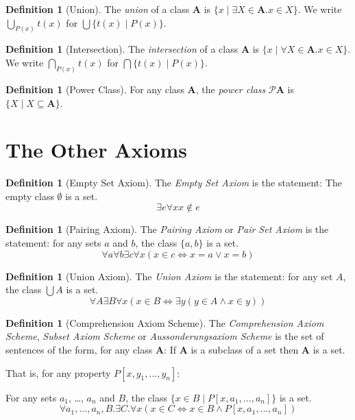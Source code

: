 \documentclass{book}
\theoremstyle{definition}
\newtheorem{df}[ax]{Definition}
\begin{document}
\begin{df}[Union]
The \emph{union} of a class $\mathbf{A}$ is $\{ x \mid \exists X \in \mathbf{A}. x \in X\}$.
We write $\bigcup_{P(x)} t(x)$ for $\bigcup \{ t(x) \mid P(x) \}$.
\end{df}

\begin{df}[Intersection]
The \emph{intersection} of a class $\mathbf{A}$ is $\{ x \mid \forall X \in \mathbf{A}. x \in X \}$. We write $\bigcap_{P(x)} t(x)$ for $\bigcap \{ t(x) \mid P(x) \}$.
\end{df}

\begin{df}[Power Class]
For any class $\mathbf{A}$, the \emph{power class} $\mathcal{P} \mathbf{A}$ is $\{ X \mid X \subseteq \mathbf{A} \}$.
\end{df}

\section{The Other Axioms}

\begin{df}[Empty Set Axiom]
The \emph{Empty Set Axiom} is the statement: The empty class $\emptyset$ is a set.
\[ \exists e \forall x x \notin e \]
\end{df}

\begin{df}[Pairing Axiom]
The \emph{Pairing Axiom} or \emph{Pair Set Axiom} is the statement: for any sets $a$ and $b$, the class $\{a,b\}$ is a set.
\[ \forall a \forall b \exists c \forall x (x \in c \Leftrightarrow x = a \vee x = b) \]
\end{df}

\begin{df}[Union Axiom]
The \emph{Union Axiom} is the statement: for any set $A$, the class $\bigcup A$ is a set.
\[ \forall A \exists B \forall x (x \in B \Leftrightarrow \exists y (y \in A \wedge x \in y)) \]
\end{df}

\begin{df}[Comprehension Axiom Scheme]
The \emph{Comprehension Axiom Scheme}, \emph{Subset Axiom Scheme} or \emph{Aussonderungsaxiom Scheme} is the set of sentences of the form, for any class $\mathbf{A}$: If $\mathbf{A}$ is a subclass of a set then $\mathbf{A}$ is a set.

That is, for any property $P[x,y_1,\ldots,y_n]$:

For any sets $a_1$, \ldots, $a_n$ and $B$, the class $\{ x \in B \mid P[x,a_1, \ldots, a_n] \}$ is a set.
\[ \forall a_1, \ldots, a_n, B. \exists C. \forall x (x \in C \Leftrightarrow x \in B \wedge P[x,a_1, \ldots, a_n]) \]
\end{df}
\end{document}
